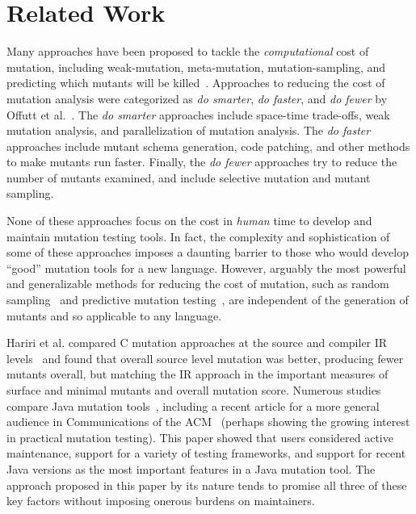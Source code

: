 \documentclass[sigconf,review, anonymous]{acmart}
\begin{document}
{\section{Related Work}

Many approaches have been proposed to tackle the \emph{computational} cost of mutation, including weak-mutation, 
meta-mutation, mutation-sampling, and predicting which mutants will be
killed~\cite{offuttMutant1996,
  untch1993mutation,KaufmanFAKAJ2022,zhang2016pmt}.  Approaches to reducing the cost of
mutation analysis were categorized as \textit{do smarter}, \textit{do
faster}, and \textit{do fewer} by Offutt et al.~\cite{offutt2001mutation}.
The \textit{do smarter} approaches include space-time trade-offs, weak
mutation analysis, and parallelization of mutation analysis. The \textit{do
faster} approaches include mutant schema generation, code patching, and
other methods to make mutants run faster. Finally, the
\textit{do fewer} approaches try to reduce the number of mutants examined,
and include selective mutation and mutant sampling.

None of these approaches focus on the cost in \emph{human} time to
develop and maintain mutation testing tools.  In fact, the complexity
and sophistication of some of these approaches imposes a daunting
barrier to those who would develop ``good'' mutation tools for a new
language.  However, arguably the most powerful and generalizable
methods for reducing the cost of mutation, such as random sampling~\cite{GopinathSampleSize,gopinath2017mutation} and
predictive mutation testing~\cite{zhang2016pmt,kim2022predictive}, are independent of the generation of
mutants and so applicable to any language.

Hariri et al. compared C mutation approaches at the source and
compiler IR levels~\cite{CompareSrcBinary} and found that overall
source level mutation was better, producing fewer mutants overall, but
matching the IR approach in the important measures of surface and
minimal mutants and overall mutation score.  Numerous studies compare
Java mutation tools~\cite{MajorPIT,gopinath2017does}, including a
recent article for a more general audience in Communications of the
ACM~\cite{CommACMJavaTool} (perhaps showing the growing interest in
practical mutation testing).  This paper showed that users
considered active maintenance, support for a variety of testing
frameworks, and support for recent Java versions as the most important
features in a Java mutation tool.  The approach proposed in this paper
by its nature tends to promise all three of these key factors without
imposing onerous burdens on maintainers.

}
\end{document}
